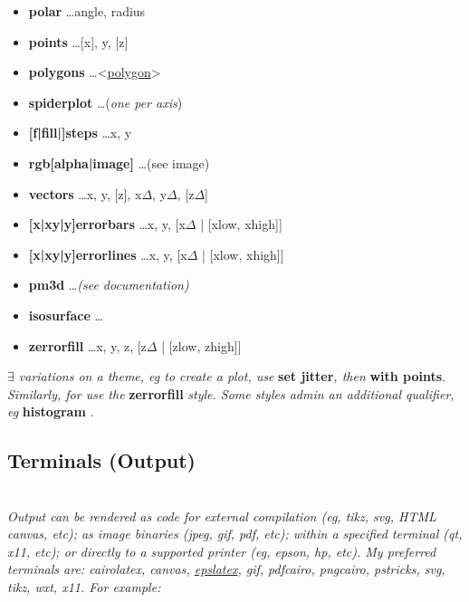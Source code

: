 {\begin{itemize}
    \item \textbf{polar}  \dots angle, radius 
    \item \textbf{points} \dots [x], y, [z]
    \item \textbf{polygons} \dots <\href{http://gnuplot.sourceforge.net/demo\_5.5/polygons.html}{polygon}>
    \item \textbf{spiderplot} \dots (\textit{one per axis}) 
    \item \textbf{{[f|fill|]}steps} \dots x, y
    \item \textbf{rgb[alpha|image]} \dots (see image)
    \item \textbf{vectors} \dots x, y, [z], x$\Delta$, y$\Delta$, [z$\Delta$] 
    \item \textbf{{[x|xy|y]}errorbars} \dots x, y, [x$\Delta$ | [xlow, xhigh]] 
    \item \textbf{{[x|xy|y]}errorlines} \dots x, y, [x$\Delta$ | [xlow, xhigh]] 
    \item \textbf{pm3d} \dots \textit{(see documentation)}
    \item \textbf{isosurface} \dots <voxel-grid-file>
    \item \textbf{zerrorfill} \dots x, y, z, [z$\Delta$ | [zlow, zhigh]] 
\end{itemize}}

\textit{$\exists$ variations on a theme, eg to create a  plot, use }\textbf{set jitter}\textit{, then }\textbf{with points}.\textit{ Similarly, for  use the }\textbf{zerrorfill}\textit{ style. Some styles admin an additional qualifier, eg }\textbf{histogram }.\\


\subsection*{Terminals (Output)}

\\

\textit{Output can be rendered as code for external compilation (eg, tikz, svg, HTML canvas, etc); as image binaries (jpeg, gif, pdf, etc); within a specified terminal (qt, x11, etc); or directly to a supported printer (eg, epson, hp, etc). My preferred terminals are: cairolatex, canvas, \href{http://gnuplot.sourceforge.net/docs/tutorial.pdf}{epslatex}, gif, pdfcairo, pngcairo, pstricks, svg, tikz, wxt, x11. For example:}

